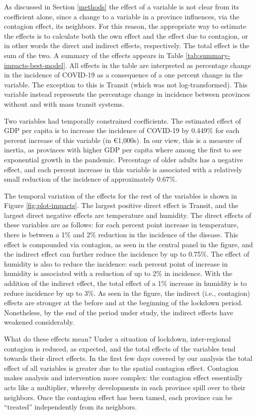 \documentclass[]{elsarticle} %
\begin{document}
As discussed in Section \ref{methods} the effect of a variable is not
clear from its coefficient alone, since a change to a variable in a
province influences, via the contagion effect, its neighbors. For this
reason, the appropriate way to estimate the effects is to calculate both
the own effect and the effect due to contagion, or in other words the
direct and indirect effects, respectively. The total effect is the sum
of the two. A summary of the effects appears in Table
\ref{tab:summary-impacts-best-model}. All effects in the table are
interpreted as percentage change in the incidence of COVID-19 as a
consequence of a one percent change in the variable. The exception to
this is Transit (which was not log-transformed). This variable instead
represents the percentage change in incidence between provinces without
and with mass transit systems.

Two variables had temporally constrained coefficients. The estimated
effect of GDP per capita is to increase the incidence of COVID-19 by
0.449\% for each percent increase of this variable (in €1,000s). In our
view, this is a measure of inertia, as provinces with higher GDP per
capita where among the first to see exponential growth in the pandemic.
Percentage of older adults has a negative effect, and each percent
increase in this variable is associated with a relatively small
reduction of the incidence of approximately 0.67\%.

The temporal variation of the effects for the rest of the variables is
shown in Figure \ref{fig:plot-impacts}. The largest positive direct
effect is Transit, and the largest direct negative effects are
temperature and humidity. The direct effects of these variables are as
follows: for each percent point increase in temperature, there is
between a 1\% and 2\% reduction in the incidence of the disease. This
effect is compounded via contagion, as seen in the central panel in the
figure, and the indirect effect can further reduce the incidence by up
to 0.75\%. The effect of humidity is also to reduce the incidence: each
percent point of increase in humidity is associated with a reduction of
up to 2\% in incidence. With the addition of the indirect effect, the
total effect of a 1\% increase in humidity is to reduce incidence by up
to 3\%. As seen in the figure, the indirect (i.e., contagion) effects
are stronger at the before and at the beginning of the lockdown period.
Nonetheless, by the end of the period under study, the indirect effects
have weakened considerably.

What do these effects mean? Under a situation of lockdown,
inter-regional contagion is reduced, as expected, and the total effects
of the variables tend towards their direct effects. In the first few
days covered by our analysis the total effect of all variables is
greater due to the spatial contagion effect. Contagion makes analysis
and intervention more complex: the contagion effect essentially acts
like a multiplier, whereby developments in each province spill over to
their neighbors. Once the contagion effect has been tamed, each province
can be ``treated'' independently from its neighbors.
\end{document}
